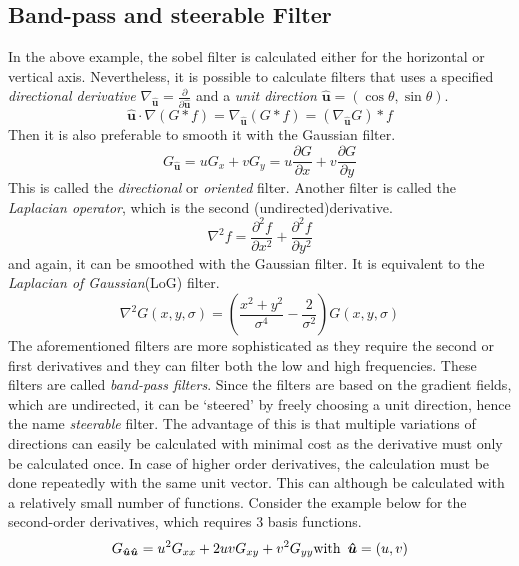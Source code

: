\documentclass[twoside,a4paper,article]{combine}
\begin{document}
\subsection{Band-pass and steerable Filter}
In the above example, the sobel filter is calculated either for the horizontal or
vertical axis. Nevertheless, it is possible to calculate filters that uses a specified 
\emph{directional derivative} $\nabla_{\boldsymbol{\hat{u}}} = \frac{\partial}{\partial\boldsymbol{\hat{u}}}$ 
and a \emph{unit direction} $\boldsymbol{\hat{u}} = (\cos \theta, \sin \theta)$\cite{Szeliski_2022}.
\[
    \boldsymbol{\hat{u}} \cdot \nabla (G \ast f) = \nabla_{\boldsymbol{\hat{u}}}(G \ast f) = (\nabla_{\boldsymbol{\hat{u}}}G) \ast  f
\]
Then it is also preferable to smooth it with the Gaussian filter.
\[
    G_{\boldsymbol{\hat{u}}} = u G_x + v G_y = u \frac{\partial G}{\partial x} + v \frac{\partial G}{\partial y} 
\]
This is called the \emph{directional} or \emph{oriented} filter.
Another filter is called the \emph{Laplacian operator}, which is the second (undirected)derivative.\cite{Szeliski_2022}
\[
    \nabla^2 f = \frac{\partial^2 f}{\partial x^2} + \frac{\partial^2 f}{\partial y^2}
\]
and again, it can be smoothed with the Gaussian filter. It is equivalent to the \emph{Laplacian of Gaussian}(LoG) filter.
\[
    \nabla^2 G (x, y, \sigma) = (\frac{x^2 + y^2}{\sigma^4} - \frac{2}{\sigma^2}) G (x, y, \sigma)
\]
The aforementioned filters are more sophisticated as they require the second or first derivatives and they can filter both the low and high frequencies. 
These filters are called \emph{band-pass filters}.
Since the filters are based on the gradient fields, which are undirected, it can be `steered' by freely choosing a unit direction, hence the name
\emph{steerable} filter. The advantage of this is that multiple variations of directions can easily be calculated with minimal cost as the derivative must only be calculated once. In case of higher order derivatives,
the calculation must be done repeatedly with the same unit vector. This can although be calculated with a relatively small number of functions\cite{Szeliski_2022}. Consider the example below for the second-order derivatives,
which requires 3 basis functions.
\[
    G_{\boldsymbol{\hat{u}}\boldsymbol{\hat{u}}} = u^2 G_{xx} + 2uvG_{xy} + v^2 G_{yy} \text{with} \hspace*{0.5em}\boldsymbol{\hat{u}} = (u, v)
\]



\end{document}
